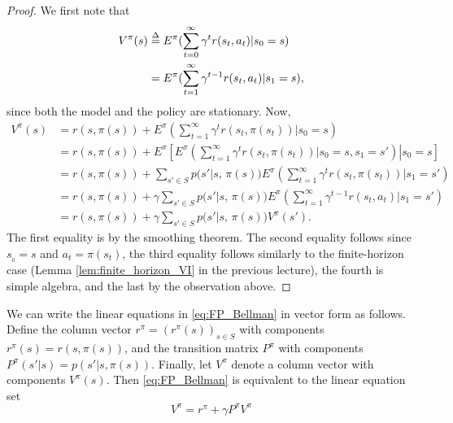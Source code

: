 \begin{proof} We first note that
\begin{align*}
V_{}^\pi (s) &\buildrel \Delta \over = {E^\pi }(\sum\limits_{t = 0}^\infty  {{\gamma ^t}r({s_t},{a_t})} |{s_0} = s)\\
 &= {E^\pi }(\sum\limits_{t = 1}^\infty  {{\gamma ^{t - 1}}r({s_t},{a_t})} |{s_1} = s),
\end{align*}
since both the model and the policy are stationary. Now,
\begin{align*}
V_{}^\pi (s) &= r(s,\pi (s)) + {E^\pi }(\sum\limits_{t = 1}^\infty  {{\gamma ^t}r({s_t},\pi ({s_t}))} |{s_0} = s)\\
&= r(s,\pi (s)) + {E^\pi }\left[\left.{E^\pi }\left(\sum\limits_{t = 1}^\infty  {{\gamma ^t}r({s_t},\pi ({s_t}))} |{s_0} = s, s_1=s'\right)\right|{s_0} = s\right]\\
 &= r(s,\pi (s)) + \sum\limits_{s' \in S}^{} {p(s'|s,\,} \pi (s)){E^\pi }(\sum\limits_{t = 1}^\infty  {{\gamma ^t}r({s_t},\pi ({s_t}))} |{s_1} = s')\\
 &= r(s,\pi (s)) + \gamma \sum\limits_{s' \in S}^{} {p(s'|s,\,} \pi (s)){E^\pi }(\sum\limits_{t = 1}^\infty  {{\gamma ^{t - 1}}r({s_t},{a_t})} |{s_1} = s')\\
 &= r(s,\pi (s)) + \gamma \sum\limits_{s' \in S}^{} {p(s'|s,\,} \pi (s)){V^\pi }(s').
\end{align*}
The first equality is by the smoothing theorem. The second equality follows since ${s_{_0}} = s$ and ${a_t} = \pi ({s_t})$, the third equality follows similarly to the finite-horizon case (Lemma \ref{lem:finite_horizon_VI} in the previous lecture), the fourth is simple algebra, and the last by the observation above.
\end{proof}

We can write the linear equations in \eqref{eq:FP_Bellman} in vector form as follows. Define the column vector ${r^\pi } = {({r^\pi }(s))_{s \in S}}$ with components ${r^\pi }(s) = r(s,\pi (s))$, and the transition matrix ${P^\pi }$ with components ${P^\pi }(s'|s) = p(s'|s,\pi (s))$. Finally, let ${V^\pi }$ denote a column vector with components ${V^\pi }(s)$. Then \eqref{eq:FP_Bellman} is equivalent to the linear equation set
\begin{equation}\label{eq:PF_Bellman_vector}
{V^\pi } = {r^\pi } + \gamma {P^\pi }{V^\pi }
\end{equation}

